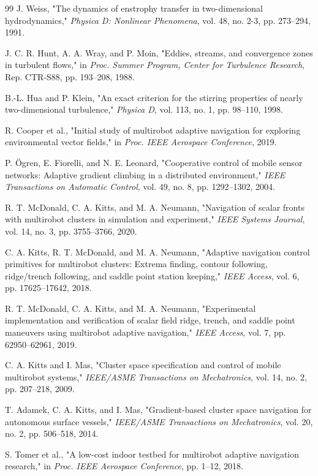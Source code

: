\documentclass[lettersize,journal]{IEEEtran}
\begin{document}
\begin{thebibliography}{99}
 J. Weiss, "The dynamics of enstrophy transfer in two-dimensional
hydrodynamics," \textit{Physica D: Nonlinear Phenomena}, vol. 48, no. 2-3,
pp. 273--294, 1991.

 J. C. R. Hunt, A. A. Wray, and P. Moin, "Eddies, streams, and
convergence zones in turbulent flows," in \textit{Proc. Summer Program,
Center for Turbulence Research}, Rep. CTR-S88, pp. 193--208, 1988.

 B.-L. Hua and P. Klein, "An exact criterion for the stirring
properties of nearly two-dimensional turbulence," \textit{Physica D}, vol. 113,
no. 1, pp. 98--110, 1998.

 R. Cooper et al., "Initial study of multirobot adaptive
navigation for exploring environmental vector fields," in \textit{Proc.
IEEE Aerospace Conference}, 2019.

 P. Ögren, E. Fiorelli, and N. E. Leonard, "Cooperative control
of mobile sensor networks: Adaptive gradient climbing in a distributed
environment," \textit{IEEE Transactions on Automatic Control}, vol. 49, no. 8,
pp. 1292--1302, 2004.

 R. T. McDonald, C. A. Kitts, and M. A. Neumann, "Navigation of
scalar fronts with multirobot clusters in simulation and experiment,"
\textit{IEEE Systems Journal}, vol. 14, no. 3, pp. 3755--3766, 2020.

 C. A. Kitts, R. T. McDonald, and M. A. Neumann, "Adaptive
navigation control primitives for multirobot clusters: Extrema finding,
contour following, ridge/trench following, and saddle point station keeping,"
\textit{IEEE Access}, vol. 6, pp. 17625--17642, 2018.

 R. T. McDonald, C. A. Kitts, and M. A. Neumann, "Experimental
implementation and verification of scalar field ridge, trench, and saddle
point maneuvers using multirobot adaptive navigation," \textit{IEEE Access},
vol. 7, pp. 62950--62961, 2019.

 C. A. Kitts and I. Mas, "Cluster space specification and control
of mobile multirobot systems," \textit{IEEE/ASME Transactions on Mechatronics},
vol. 14, no. 2, pp. 207--218, 2009.

 T. Adamek, C. A. Kitts, and I. Mas, "Gradient-based cluster space
navigation for autonomous surface vessels," \textit{IEEE/ASME Transactions on
Mechatronics}, vol. 20, no. 2, pp. 506--518, 2014.

 S. Tomer et al., "A low-cost indoor testbed for multirobot
adaptive navigation research," in \textit{Proc. IEEE Aerospace Conference},
pp. 1--12, 2018.


\end{thebibliography}
\end{document}
